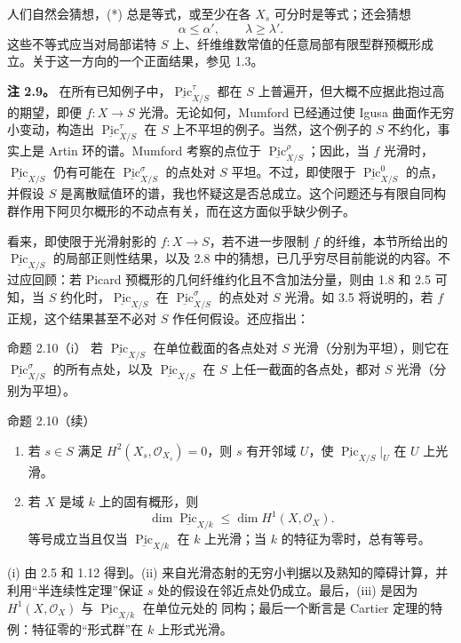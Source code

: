 人们自然会猜想，(*) 总是等式，或至少在各 $X_s$ 可分时是等式；还会猜想
\begin{equation}\label{pp-specialization-starstarstar}
 \alpha\leq\alpha',\qquad\lambda\geq\lambda'.\tag{***}
\end{equation}
这些不等式应当对局部诺特 $S$ 上、纤维维数常值的任意局部有限型群预概形成立。关于这一方向的一个正面结果，参见 1.3。

\textbf{注 2.9。} 在所有已知例子中，$\underline{\operatorname{Pic}}^\tau_{X/S}$ 都在 $S$ 上普遍开，但大概不应据此抱过高的期望，即便 $f\colon X\to S$ 光滑。无论如何，Mumford 已经通过使 Igusa 曲面作无穷小变动，构造出 $\underline{\operatorname{Pic}}^\tau_{X/S}$ 在 $S$ 上不平坦的例子。当然，这个例子的 $S$ 不约化，事实上是 Artin 环的谱。Mumford 考察的点位于 $\underline{\operatorname{Pic}}^\rho_{X/S}$；因此，当 $f$ 光滑时，$\underline{\operatorname{Pic}}_{X/S}$ 仍有可能在 $\underline{\operatorname{Pic}}^\sigma_{X/S}$ 的点处对 $S$ 平坦。不过，即使限于 $\underline{\operatorname{Pic}}^0_{X/S}$ 的点，并假设 $S$ 是离散赋值环的谱，我也怀疑这是否总成立。这个问题还与有限自同构群作用下阿贝尔概形的不动点有关，而在这方面似乎缺少例子。

看来，即使限于光滑射影的 $f\colon X\to S$，若不进一步限制 $f$ 的纤维，本节所给出的 $\underline{\operatorname{Pic}}_{X/S}$ 的局部正则性结果，以及 2.8 中的猜想，已几乎穷尽目前能说的内容。不过应回顾：若 Picard 预概形的几何纤维约化且不含加法分量，则由 1.8 和 2.5 可知，当 $S$ 约化时，$\underline{\operatorname{Pic}}_{X/S}$ 在 $\underline{\operatorname{Pic}}^\sigma_{X/S}$ 的点处对 $S$ 光滑。如 3.5 将说明的，若 $f$ 正规，这个结果甚至不必对 $S$ 作任何假设。还应指出：

\begin{statement}{命题 2.10（i）}
若 $\underline{\operatorname{Pic}}_{X/S}$ 在单位截面的各点处对 $S$ 光滑（分别为平坦），则它在 $\underline{\operatorname{Pic}}^\sigma_{X/S}$ 的所有点处，以及 $\underline{\operatorname{Pic}}_{X/S}$ 在 $S$ 上任一截面的各点处，都对 $S$ 光滑（分别为平坦）。
\end{statement}

\begin{statement}{命题 2.10（续）}
\begin{enumerate}
\item[(ii)] 若 $s\in S$ 满足 $H^2(X_s,\mathcal O_{X_s})=0$，则 $s$ 有开邻域 $U$，使 $\underline{\operatorname{Pic}}_{X/S}|_U$ 在 $U$ 上光滑。
\item[(iii)] 若 $X$ 是域 $k$ 上的固有概形，则
\[
 \dim\underline{\operatorname{Pic}}_{X/k}\leq\dim H^1(X,\mathcal O_X).
\]
等号成立当且仅当 $\underline{\operatorname{Pic}}_{X/k}$ 在 $k$ 上光滑；当 $k$ 的特征为零时，总有等号。
\end{enumerate}
\end{statement}
(i) 由 2.5 和 1.12 得到。(ii) 来自光滑态射的无穷小判据以及熟知的障碍计算，并利用“半连续性定理”保证 $s$ 处的假设在邻近点处仍成立。最后，(iii) 是因为 $H^1(X,\mathcal O_X)$ 与 $\underline{\operatorname{Pic}}_{X/k}$ 在单位元处的  同构；最后一个断言是 Cartier 定理的特例：特征零的“形式群”在 $k$ 上形式光滑。

